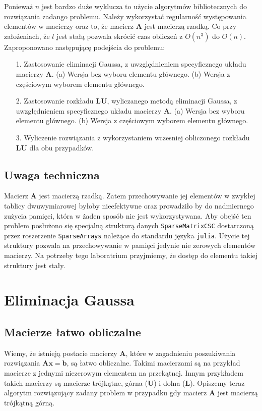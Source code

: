 \documentclass[]{article}
\begin{document}
Ponieważ $n$ jest bardzo duże wyklucza to użycie algorytmów bibliotecznych do rozwiązania zadango problemu. Należy wykorzystać regularność występowania elementów w macierzy oraz to, że macierz $\mathbf{A}$ jest macierzą rzadką. Co przy założeniach, że $l$ jest stałą pozwala skrócić czas obliczeń z $O(n^3)$ do $O(n)$. Zaproponowano następującę podejścia do problemu:
\begin{itemize}
	\item[1.] Zastosowanie eliminacji Gaussa, z uwzględnieniem specyficznego układu macierzy $\mathbf{A}$.
	\subitem(a) Wersja bez wyboru elementu głównego.
	\subitem(b) Wersja z częściowym wyborem elementu głównego.
	\item[2.] Zastosowanie rozkładu $\mathbf{LU}$, wyliczanego metodą eliminacji Gaussa, z uwzględnieniem specyficznego układu macierzy $\mathbf{A}$. 
	\subitem(a) Wersja bez wyboru elementu głównego.
	\subitem(b) Wersja z częściowym wyborem elementu głównego.
	\item[3.] Wyliczenie rozwiązania z wykorzystaniem wczesniej obliczonego rozkładu $\mathbf{LU}$ dla obu przypadków.
\end{itemize}
\subsection{Uwaga techniczna}
Macierz $\mathbf{A}$ jest macierzą rzadką. Zatem przechowywanie jej elementów w zwykłej tablicy dwuwymiarowej byłoby nieefektywne oraz prowadziło by do nadmiernego zużycia pamięci, która w żaden sposób nie jest wykorzystywana. Aby obejść ten problem posłużono się specjalną strukturą danych \texttt{SparseMatrixCSC} dostarczoną przez roszerzenie \texttt{SparseArrays} należące do standardu języka \texttt{julia}. Użycie tej struktury pozwala na przechowywanie w pamięci jedynie nie zerowych elementów macierzy. Na potrzeby tego laboratrium przyjmiemy, że dostęp do elementu takiej struktury jest stały.    
\section{Eliminacja Gaussa}
\subsection{Macierze łatwo obliczalne}
Wiemy, że istnieją postacie macierzy $\mathbf{A}$, które w zagadnieniu poszukiwania rozwiązania $\mathbf{Ax} = \mathbf{b}$, są łatwo obliczalne. Takimi macierzami są na przykład macierze z jednymi niezerowym elementem na przekątnej. Innym przykładem takich macierzy są macierze trójkątne, górna (\textbf{U}) i  dolna (\textbf{L}). Opiszemy teraz algorytm rozwiązujący zadany problem w przypadku gdy macierz $\mathbf{A}$ jest macierzą trójkątną górną. 
\end{document}
